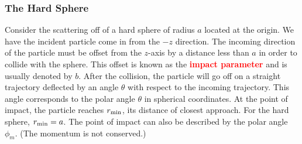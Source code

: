 \documentclass[12pt,a4paper]{article}
\begin{document}
\subsubsection{The Hard Sphere}
\cite{benacquista2018classical} Consider the scattering off of a hard sphere of radius $a$ located at the origin. We have the incident particle come in from the $-z$ direction. The incoming direction of the particle must be offset from the $z$-axis by a distance less than $a$ in order to collide with the sphere. This offset is known as the \textcolor{red}{\bf impact parameter} and is usually denoted by $b$. After the collision, the particle will go off on a straight trajectory deflected by an angle $\theta$ with respect to the incoming trajectory. This angle corresponds to the polar angle $\theta$ in spherical coordinates. At the point of impact, the particle reaches $r_{\rm min}$, its distance of closest approach. For the hard sphere, $r_{\rm min} = a$. The point of impact can also be described by the polar angle $\phi_{m}$. (The momentum is not conserved.)
\end{document}

